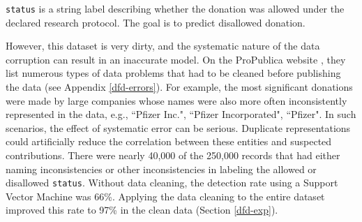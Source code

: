 \noindent\texttt{status} is a string label describing whether the  donation was allowed under the declared research protocol. The goal is to predict disallowed  donation. 

\vspace{0.5em}

However, this dataset is very dirty, and the systematic nature of the data corruption can result in an inaccurate model.
On the ProPublica website \cite{dollarsfordocs}, they list numerous types of data problems that had to be cleaned before publishing the data (see Appendix \ref{dfd-errors}).
For example, the most significant donations were made by large companies whose names were also more often inconsistently represented in the data, e.g., ``Pfizer Inc.", ``Pfizer Incorporated", ``Pfizer".
In such scenarios, the effect of systematic error can be serious.
Duplicate representations could artificially reduce the correlation between these entities and suspected contributions.
There were nearly 40,000 of the 250,000 records that had either naming inconsistencies or other inconsistencies in labeling the allowed or disallowed \texttt{status}.
Without data cleaning, the detection rate using a Support Vector Machine was 66\%.
Applying the data cleaning to the entire dataset improved this rate to 97\% in the clean data (Section \ref{dfd-exp}).

